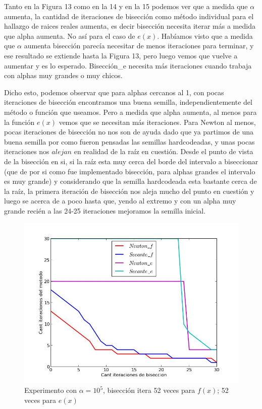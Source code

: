 Tanto en la Figura 13 como en la 14 y en la 15 podemos ver que a medida que $\alpha$ aumenta, la cantidad de iteraciones de bisección como método individual para el hallazgo de raices reales aumenta, es decir bisección necesita iterar más a medida que alpha aumenta. No así para el caso de $e(x)$. Habíamos visto que a medida que $\alpha$ aumenta bisección parecía necesitar de menos iteraciones para terminar, y ese resultado se extiende hasta la Figura 13, pero luego vemos que vuelve a aumentar y es lo esperado. Bisecci\'on\_e necesita más iteraciones cuando trabaja con alphas muy grandes o muy chicos.

Dicho esto, podemos observar que para alphas cercanos al 1, con pocas iteraciones de bisección encontramos una buena semilla, independientemente del método o función que useamos. Pero a medida que alpha aumenta, al menos para la función $e(x)$ vemos que se necesitan más iteraciones. Para Newton al menos, pocas iteraciones de bisección no nos son de ayuda dado que ya partimos de una buena semilla por como fueron pensadas las semillas hardcodeadas, y unas pocas iteraciones nos $alejan$ en realidad de la raíz en cuestión. Desde el punto de vista de la bisección en si, si la raíz esta muy cerca del borde del intervalo a biseccionar (que de por si como fue implementado bisección, para alphas grandes el intervalo es muy grande) y considerando que la semilla hardcodeada esta bastante cerca de la raíz, la primera iteración de bisección nos aleja mucho del punto en cuestión y luego se acerca de a poco hasta que, yendo al extremo y con un alpha muy grande recién a las 24-25 iteraciones mejoramos la semilla inicial.

\begin{figure}[!h]
	\begin{center}
		  \includegraphics[scale=0.5]{../Imagenes/exp4/experimento_biseccion_5.jpg}
		  \caption{Experimento con $\alpha = 10^{5}$, bisección itera 52 veces para $f(x)$; 52 veces para $e(x)$}
		  \label{fig:contra1}
	\end{center}
\end{figure}
\FloatBarrier

